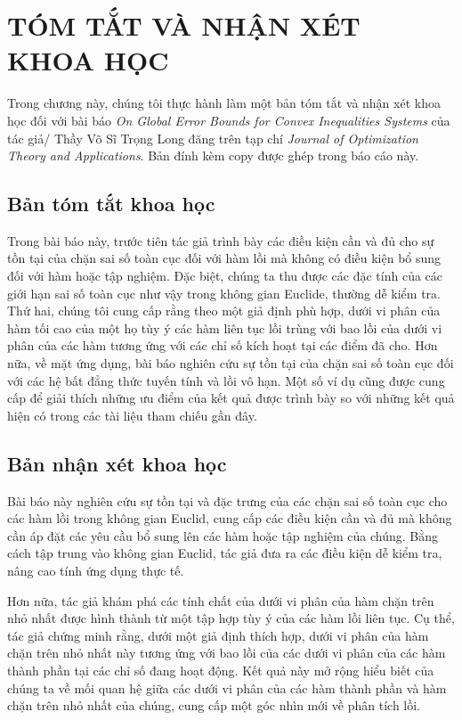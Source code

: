\chapter{TÓM TẮT VÀ NHẬN XÉT KHOA HỌC}

Trong chương này, chúng tôi thực hành làm một bản tóm tắt và nhận xét khoa học đối với bài báo \emph{On Global Error Bounds for Convex Inequalities Systems} của tác giả/ Thầy Võ Sĩ Trọng Long đăng trên tạp chí \emph{Journal of Optimization Theory and Applications}. Bản đính kèm copy được ghép trong báo cáo này.

\section{Bản tóm tắt khoa học}

Trong bài báo này, trước tiên tác giả trình bày các điều kiện cần và đủ cho sự tồn tại của chặn sai số toàn cục đối với hàm lồi mà không có điều kiện bổ sung đối với hàm hoặc tập nghiệm. Đặc biệt, chúng ta thu được các đặc tính của các giới hạn sai số toàn cục như vậy trong không gian Euclide, thường dễ kiểm tra. Thứ hai, chúng tôi cung cấp
rằng theo một giả định phù hợp, dưới vi phân của hàm tối cao của một họ tùy ý các hàm liên tục lồi trùng với bao lồi của dưới vi phân của các hàm tương ứng với các chỉ số kích hoạt tại các điểm đã cho. Hơn nữa, về mặt ứng dụng, bài báo nghiên cứu sự tồn tại của chặn sai số toàn cục đối với các hệ bất đẳng thức tuyến tính và lồi vô hạn. Một số ví dụ cũng được cung cấp để giải thích những ưu điểm của kết quả được trình bày so với những kết quả hiện có trong các tài liệu tham chiếu gần đây.

\section{Bản nhận xét khoa học}

Bài báo này nghiên cứu sự tồn tại và đặc trưng của các chặn sai số toàn cục cho các hàm lồi trong không gian Euclid, cung cấp các điều kiện cần và đủ mà không cần áp đặt các yêu cầu bổ sung lên các hàm hoặc tập nghiệm của chúng. Bằng cách tập trung vào không gian Euclid, tác giả đưa ra các điều kiện dễ kiểm tra, nâng cao tính ứng dụng thực tế.

Hơn nữa, tác giả khám phá các tính chất của dưới vi phân của hàm chặn trên nhỏ nhất được hình thành từ một tập hợp tùy ý của các hàm lồi liên tục. Cụ thể, tác giả chứng minh rằng, dưới một giả định thích hợp, dưới vi phân của hàm chặn trên nhỏ nhất  này tương ứng với bao lồi của các dưới vi phân của các hàm thành phần tại các chỉ số đang hoạt động. Kết quả này mở rộng hiểu biết của chúng ta về mối quan hệ giữa các dưới vi phân của các hàm thành phần và hàm chặn trên nhỏ nhất của chúng, cung cấp một góc nhìn mới về phân tích lồi.


